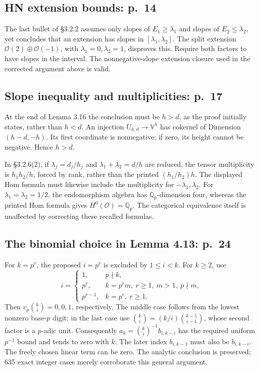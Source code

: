 \documentclass[10pt]{article}
\begin{document}
\subsection*{HN extension bounds: p. 14}
The last bullet of §3.2.2 assumes only slopes of \(E_1\geq\lambda_1\) and slopes of \(E_2\leq\lambda_2\), yet concludes that an extension has slopes in \([\lambda_1,\lambda_2]\). The split extension \(\mathcal O(2)\oplus\mathcal O(-1)\), with \(\lambda_1=0,\lambda_2=1\), disproves this. Require both factors to have slopes in the interval. The nonnegative-slope extension closure used in the corrected argument above is valid.\par
\subsection*{Slope inequality and multiplicities: p. 17}
At the end of Lemma 3.16 the conclusion must be \(h>d\), as the proof initially states, rather than \(h<d\). An injection \(U_{h,d}\to\mathbb V^h\) has cokernel of Dimension \((h-d,-h)\). Its first coordinate is nonnegative; if zero, its height cannot be negative. Hence \(h>d\).\par
In §3.2.6(2), if \(\lambda_j=d_j/h_j\) and \(\lambda_1+\lambda_2=d/h\) are reduced, the tensor multiplicity is \(h_1h_2/h\), forced by rank, rather than the printed \((h_1/h_2)h\). The displayed Hom formula must likewise include the multiplicity for \(-\lambda_1,\lambda_2\). For \(\lambda_1=\lambda_2=1/2\), the endomorphism algebra has \(\mathbb Q_p\)-dimension four, whereas the printed Hom formula gives \(H^0(\mathcal O)=\mathbb Q_p\). The categorical equivalence itself is unaffected by correcting these recalled formulas.\par
\subsection*{The binomial choice in Lemma 4.13: p. 24}
For \(k=p^r\), the proposed \(i=p^r\) is excluded by \(1\leq i<k\). For \(k\geq2\), use \[i=\begin{cases}
 1,&p\nmid k,\\
 p^r,&k=p^rm,\ r\geq1,\ m>1,\ p\nmid m,\\
 p^{r-1},&k=p^r,\ r\geq1.
 \end{cases}\] Then \(v_p\binom{k}{i}=0,0,1\), respectively. The middle case follows from the lowest nonzero base-\(p\) digit; in the last case use \(\binom{k}{i}=(k/i)\binom{k-1}{i-1}\), whose second factor is a \(p\)-adic unit. Consequently \(a_k=\binom{k}{i}^{-1}b_{i,k-i}\) has the required uniform \(p^{-1}\) bound and tends to zero with \(k\). The later index \(b_{i,k-1}\) must also be \(b_{i,k-i}\). The freely chosen linear term can be zero. The analytic conclusion is preserved; 635 exact integer cases merely corroborate this general argument.\par
\end{document}
